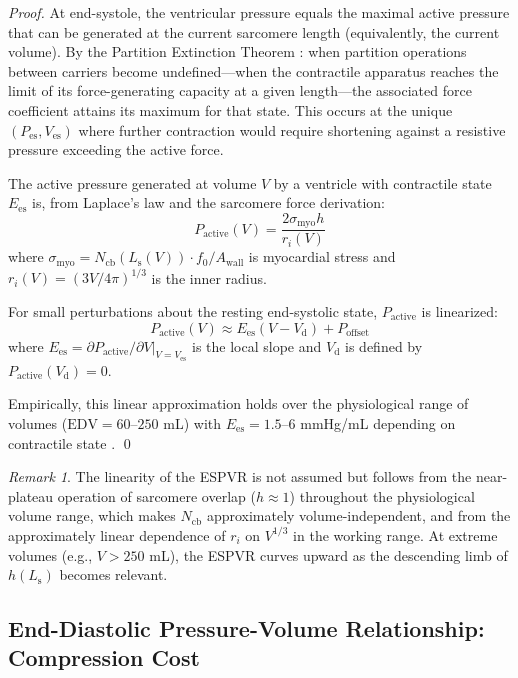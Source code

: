 \documentclass[12pt,a4paper]{article}
\theoremstyle{remark}
\newtheorem{remark}[theorem]{Remark}
\newcommand{\Ees}{E_{\mathrm{es}}}
\newcommand{\Vd}{V_{\mathrm{d}}}
\newcommand{\EDV}{\mathrm{EDV}}
\newcommand{\Ncb}{N_{\mathrm{cb}}}
\newcommand{\Ls}{L_{\mathrm{s}}}
\begin{document}
\begin{proof}
At end-systole, the ventricular pressure equals the maximal active pressure that can be generated at the current sarcomere length (equivalently, the current volume). By the Partition Extinction Theorem \cite{sachikonye2024gas}: when partition operations between carriers become undefined—when the contractile apparatus reaches the limit of its force-generating capacity at a given length—the associated force coefficient attains its maximum for that state. This occurs at the unique $(P_{\mathrm{es}}, V_{\mathrm{es}})$ where further contraction would require shortening against a resistive pressure exceeding the active force.

The active pressure generated at volume $V$ by a ventricle with contractile state $\Ees$ is, from Laplace's law and the sarcomere force derivation:
\begin{equation}
    P_{\mathrm{active}}(V) = \frac{2 \sigma_{\mathrm{myo}} h}{r_i(V)}
\end{equation}
where $\sigma_{\mathrm{myo}} = \Ncb(\Ls(V)) \cdot f_0 / A_{\mathrm{wall}}$ is myocardial stress and $r_i(V) = (3V/4\pi)^{1/3}$ is the inner radius.

For small perturbations about the resting end-systolic state, $P_{\mathrm{active}}$ is linearized:
\begin{equation}
    P_{\mathrm{active}}(V) \approx \Ees(V - \Vd) + P_{\mathrm{offset}}
\end{equation}
where $\Ees = \partial P_{\mathrm{active}}/\partial V|_{V=V_{\mathrm{es}}}$ is the local slope and $\Vd$ is defined by $P_{\mathrm{active}}(\Vd) = 0$.

Empirically, this linear approximation holds over the physiological range of volumes ($\EDV = 60$--$250$ mL) with $\Ees = 1.5$--$6$ mmHg/mL depending on contractile state \cite{suga1974instantaneous}. \qed
\end{proof}

\begin{remark}
    The linearity of the ESPVR is not assumed but follows from the near-plateau operation of sarcomere overlap ($h \approx 1$) throughout the physiological volume range, which makes $\Ncb$ approximately volume-independent, and from the approximately linear dependence of $r_i$ on $V^{1/3}$ in the working range. At extreme volumes (e.g., $V > 250$ mL), the ESPVR curves upward as the descending limb of $h(\Ls)$ becomes relevant.
\end{remark}

\subsection{End-Diastolic Pressure-Volume Relationship: Compression Cost}
\end{document}
